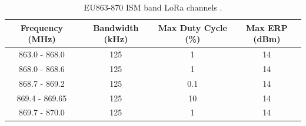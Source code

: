 \begin{table}[h]
\centering
\caption{EU863-870 ISM band LoRa channels \cite{EN300.220} \cite{lorawan.regional.parameters}.}
\label{table:max_tx_power}
\begin{tabular}{|c|c|c|c|}
\hline
\textbf{Frequency (MHz)} & \textbf{Bandwidth (kHz)} & \textbf{Max Duty Cycle (\%)} & \textbf{Max ERP (dBm)} \\ \hline
      863.0 - 868.0  &   125 &   1   &   14 \\ \hline
      868.0 - 868.6  &   125 &   1   &   14 \\ \hline
      868.7 - 869.2  &   125 &   0.1 &   14 \\ \hline
      869.4 - 869.65 &   125 &   10  &   14 \\ \hline
      869.7 - 870.0  &   125 &   1   &   14 \\ \hline
\end{tabular}
\end{table}

